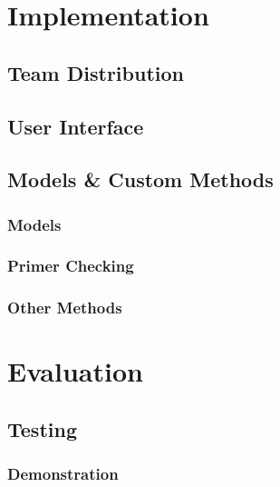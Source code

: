 \documentclass{l3proj}
\begin{document}
\chapter{Implementation}
\label{impl}

\section{Team Distribution}
\label{impl:teamdistribution}


\section{User Interface}
\label{impl:ui}


\section{Models \& Custom Methods}
\label{impl:models}

\subsection{Models}


\subsection{Primer Checking}


\subsection{Other Methods}

\chapter{Evaluation}
\label{eval}

\section{Testing}
\label{eval:testing}


\subsection{Demonstration}
\label{eval:demo}
\end{document}
